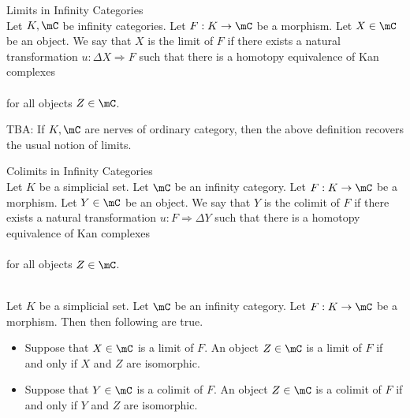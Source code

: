 \documentclass[a4paper]{article}
\begin{document}
\begin{defn}{Limits in Infinity Categories}{}\\ Let $K,\mC$ be infinity categories. Let $F:K\to\mC$ be a morphism. Let $X\in\mC$ be an object. We say that $X$ is the limit of $F$ if there exists a natural transformation $u:\Delta X\Rightarrow F$ such that there is a homotopy equivalence of Kan complexes \\
\\
for all objects $Z\in\mC$. 
\end{defn}

TBA: If $K,\mC$ are nerves of ordinary category, then the above definition recovers the usual notion of limits. 

\begin{defn}{Colimits in Infinity Categories}{}\\ Let $K$ be a simplicial set. Let $\mC$ be an infinity category. Let $F:K\to\mC$ be a morphism. Let $Y\in\mC$ be an object. We say that $Y$ is the colimit of $F$ if there exists a natural transformation $u:F\Rightarrow\Delta Y$ such that there is a homotopy equivalence of Kan complexes \\
\\
for all objects $Z\in\mC$. 
\end{defn}

\begin{prp}{}{}\\ Let $K$ be a simplicial set. Let $\mC$ be an infinity category. Let $F:K\to\mC$ be a morphism. Then then following are true. 
\begin{itemize}
\item Suppose that $X\in\mC$ is a limit of $F$. An object $Z\in\mC$ is a limit of $F$ if and only if $X$ and $Z$ are isomorphic. 
\item Suppose that $Y\in\mC$ is a colimit of $F$. An object $Z\in\mC$ is a colimit of $F$ if and only if $Y$ and $Z$ are isomorphic. 
\end{itemize}
\end{prp}
\end{document}
